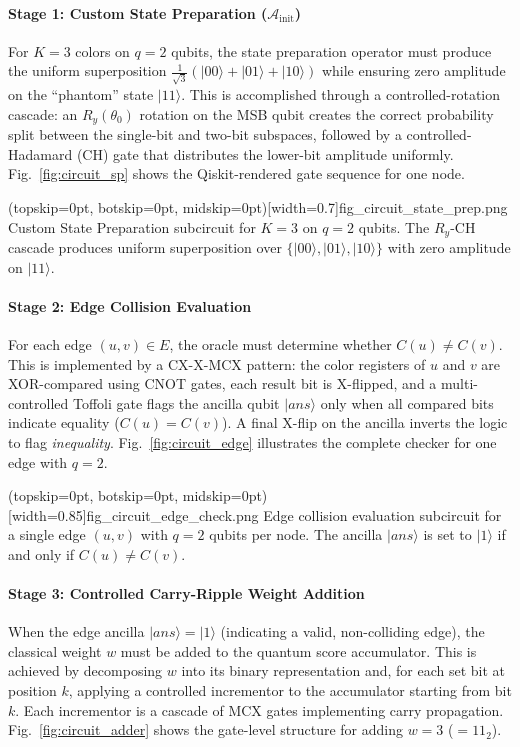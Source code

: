 \documentclass{ieeeaccess}
\begin{document}
\paragraph{Stage 1: Custom State Preparation ($\mathcal{A}_{\text{init}}$)}
For $K=3$ colors on $q=2$ qubits, the state preparation operator must produce the uniform superposition $\frac{1}{\sqrt{3}}(|00\rangle + |01\rangle + |10\rangle)$ while ensuring zero amplitude on the ``phantom'' state $|11\rangle$. This is accomplished through a controlled-rotation cascade: an $R_y(\theta_0)$ rotation on the MSB qubit creates the correct probability split between the single-bit and two-bit subspaces, followed by a controlled-Hadamard (CH) gate that distributes the lower-bit amplitude uniformly. Fig.~\ref{fig:circuit_sp} shows the Qiskit-rendered gate sequence for one node.

\Figure[t!](topskip=0pt, botskip=0pt, midskip=0pt)[width=0.7\columnwidth]{fig_circuit_state_prep.png}
{Custom State Preparation subcircuit for $K=3$ on $q=2$ qubits. The $R_y$-CH cascade produces uniform superposition over $\{|00\rangle, |01\rangle, |10\rangle\}$ with zero amplitude on $|11\rangle$.\label{fig:circuit_sp}}

\paragraph{Stage 2: Edge Collision Evaluation}
For each edge $(u,v) \in E$, the oracle must determine whether $C(u) \neq C(v)$. This is implemented by a CX-X-MCX pattern: the color registers of $u$ and $v$ are XOR-compared using CNOT gates, each result bit is X-flipped, and a multi-controlled Toffoli gate flags the ancilla qubit $|ans\rangle$ only when all compared bits indicate equality ($C(u) = C(v)$). A final X-flip on the ancilla inverts the logic to flag \textit{inequality}. Fig.~\ref{fig:circuit_edge} illustrates the complete checker for one edge with $q=2$.

\Figure[t!](topskip=0pt, botskip=0pt, midskip=0pt)[width=0.85\columnwidth]{fig_circuit_edge_check.png}
{Edge collision evaluation subcircuit for a single edge $(u,v)$ with $q=2$ qubits per node. The ancilla $|ans\rangle$ is set to $|1\rangle$ if and only if $C(u) \neq C(v)$.\label{fig:circuit_edge}}

\paragraph{Stage 3: Controlled Carry-Ripple Weight Addition}
When the edge ancilla $|ans\rangle = |1\rangle$ (indicating a valid, non-colliding edge), the classical weight $w$ must be added to the quantum score accumulator. This is achieved by decomposing $w$ into its binary representation and, for each set bit at position $k$, applying a controlled incrementor to the accumulator starting from bit $k$. Each incrementor is a cascade of MCX gates implementing carry propagation. Fig.~\ref{fig:circuit_adder} shows the gate-level structure for adding $w=3$ ($=11_2$).
\end{document}
